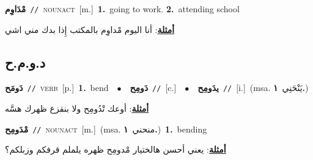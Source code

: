 \documentclass[10pt,a4paper,twoside]{article} %
\begin{document}
\begin{multicols}{2}
{\setlength\topsep{0pt}\textbf{\foreignlanguage{arabic}{مْدَاوِم}}\ {\color{gray}\texttt{//}\color{black}}\ \textsc{noun\textunderscore act}\ [m.]\ \textbf{1.}~going to work.  \textbf{2.}~attending school\  \begin{flushright}\color{gray}\foreignlanguage{arabic}{\textbf{\underline{\foreignlanguage{arabic}{أمثلة}}}: أنا اليوم مْداوِم بالمكتب إِذا بدك مني اشي}\end{flushright}\color{black}} \vspace{2mm}

\vspace{-3mm}
\subsection*{\color{blue}\foreignlanguage{arabic}{د.و.م.ح}\color{blue}{}} 

{\setlength\topsep{0pt}\textbf{\foreignlanguage{arabic}{دَومَح}}\ {\color{gray}\texttt{//}\color{black}}\ \textsc{verb}\ [p.]\ \textbf{1.}~bend\ \ $\bullet$\ \ \setlength\topsep{0pt}\textbf{\foreignlanguage{arabic}{دَومِح}}\ {\color{gray}\texttt{//}\color{black}}\ [c.]\ \ $\bullet$\ \ \setlength\topsep{0pt}\textbf{\foreignlanguage{arabic}{يدَومِح}}\ {\color{gray}\texttt{//}\color{black}}\ [i.]\ \color{gray}(msa. \foreignlanguage{arabic}{يَنْحَنِي}~\foreignlanguage{arabic}{\textbf{١.}})\color{black}\  \begin{flushright}\color{gray}\foreignlanguage{arabic}{\textbf{\underline{\foreignlanguage{arabic}{أمثلة}}}: أوعك تْدُومِح ولا بنقزع ظهرك هسَّه}\end{flushright}\color{black}} \vspace{2mm}

{\setlength\topsep{0pt}\textbf{\foreignlanguage{arabic}{مْدَومِح}}\ {\color{gray}\texttt{//}\color{black}}\ \textsc{noun\textunderscore act}\ [m.]\ \color{gray}(msa. \foreignlanguage{arabic}{منحني}~\foreignlanguage{arabic}{\textbf{١.}})\color{black}\ \textbf{1.}~bending\  \begin{flushright}\color{gray}\foreignlanguage{arabic}{\textbf{\underline{\foreignlanguage{arabic}{أمثلة}}}: يعني أحسن هالختيار مْدومِح ظهره يلملم قرفكم وزبلكم؟}\end{flushright}\color{black}} \vspace{2mm}


\end{multicols}
\end{document}
